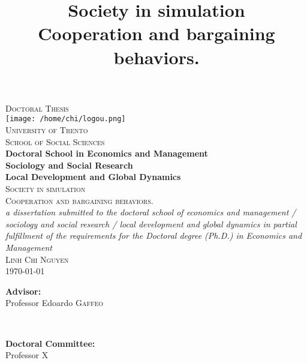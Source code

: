 \documentclass[12.5pt]{report}
\title{\textbf{Society in simulation\\
Cooperation and bargaining behaviors.}}
\author{}
\date{}
\begin{document}
\begin{titlepage}

\newcommand{\HRule}{\rule{\linewidth}{0.5mm}} 

\center 
\textsc{\LARGE Doctoral Thesis}\\[.5cm] 
\texttt{[image: /home/chi/logou.png]}\\[1cm] 
\textsc{\LARGE University of Trento}\\[.4cm] 
\textsc{\Large School of Social Sciences}\\[1cm]

 
{ \large \bfseries Doctoral School in Economics and Management\\Sociology and Social Research\\Local Development and Global Dynamics}\\[3cm]

\textsc{\Huge Society in simulation}\\[.5cm]
\textsc{\huge Cooperation and bargaining behaviors.}\\[.5cm]

\emph{a dissertation submitted to the doctoral school of economics and management
/ sociology and social research / local development and global dynamics in
partial fulfillment of the requirements for the Doctoral degree (Ph.D.) in
Economics and Management }\\[5cm]

\textsc{\Large Linh Chi Nguyen}\\[.5cm]

{\large \today}\\[5cm]

\begin{minipage}{0.4\textwidth}
\begin{flushleft} \large
\textbf{Advisor:}\\
Professor Edoardo \textsc{Gaffeo} 
\end{flushleft}
\end{minipage}
~
\begin{minipage}{0.4\textwidth}
\begin{flushright} \large
\textbf{Doctoral Committee:} \\
Professor X \textsc{ } 
\end{flushright}
\end{minipage}\\[4cm]



\vfill 

\end{titlepage}
\maketitle
\tableofcontents
\end{document}

